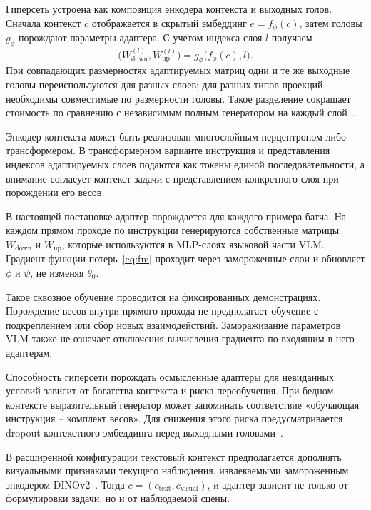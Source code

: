 \documentclass{misisarticle}
\begin{document}
Гиперсеть устроена как композиция энкодера контекста и выходных голов. Сначала контекст $c$ отображается в скрытый эмбеддинг $e=f_\phi(c)$, затем головы $g_\phi$ порождают параметры адаптера. С учетом индекса слоя $l$ получаем
\begin{equation}
  \bigl(W_{\mathrm{down}}^{(l)},W_{\mathrm{up}}^{(l)}\bigr)
  =g_\phi\bigl(f_\phi(c),l\bigr).
\label{eq:hyper}
\end{equation}
При совпадающих размерностях адаптируемых матриц одни и те же выходные головы переиспользуются для разных слоев; для разных типов проекций необходимы совместимые по размерности головы. Такое разделение сокращает стоимость по сравнению с независимым полным генератором на каждый слой~\cite{hyperlora}.

Энкодер контекста может быть реализован многослойным перцептроном либо трансформером. В трансформерном варианте инструкция и представления индексов адаптируемых слоев подаются как токены единой последовательности, а внимание согласует контекст задачи с представлением конкретного слоя при порождении его весов.

В настоящей постановке адаптер порождается для каждого примера батча. На каждом прямом проходе по инструкции генерируются собственные матрицы $W_{\mathrm{down}}$ и $W_{\mathrm{up}}$, которые используются в MLP-слоях языковой части VLM. Градиент функции потерь~\eqref{eq:fm} проходит через замороженные слои и обновляет $\phi$ и $\psi$, не изменяя $\theta_0$.

Такое сквозное обучение проводится на фиксированных демонстрациях. Порождение весов внутри прямого прохода не предполагает обучение с подкреплением или сбор новых взаимодействий. Замораживание параметров VLM также не означает отключения вычисления градиента по входящим в него адаптерам.

Способность гиперсети порождать осмысленные адаптеры для невиданных условий зависит от богатства контекста и риска переобучения. При бедном контексте выразительный генератор может запоминать соответствие «обучающая инструкция -- комплект весов». Для снижения этого риска предусматривается dropout контекстного эмбеддинга перед выходными головами~\cite{hyperlora}.

В расширенной конфигурации текстовый контекст предполагается дополнять визуальными признаками текущего наблюдения, извлекаемыми замороженным энкодером DINOv2~\cite{dinov2}. Тогда $c=(c_{\mathrm{text}},c_{\mathrm{visual}})$, и адаптер зависит не только от формулировки задачи, но и от наблюдаемой сцены.
\end{document}
